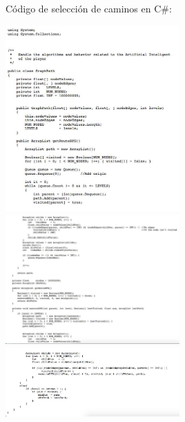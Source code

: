 \documentclass[12pt, conference]{IEEEtran}
\begin{document}
C\'{o}digo de selecci\'{o}n de caminos en C\#: 

\includegraphics[width=0.5\textwidth]{firstsnippet}
\includegraphics[width=0.5\textwidth]{secondsnippet}
\includegraphics[width=0.5\textwidth]{thirdsnippet}

%
%
\end{document}
